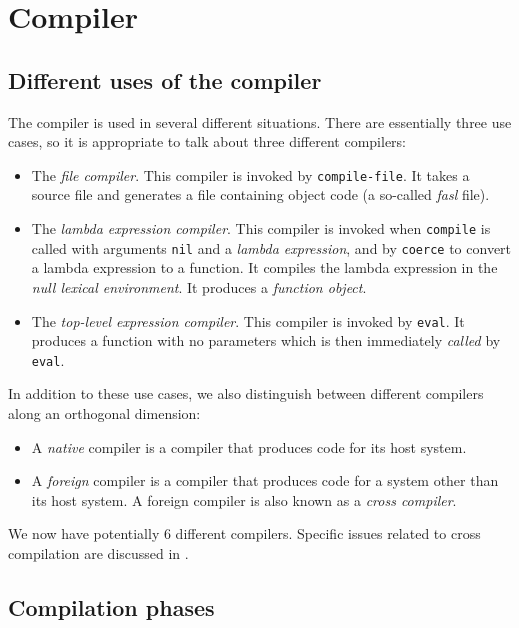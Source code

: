 \chapter{Compiler}
\label{chap-compiler}

\section{Different uses of the compiler}

The compiler is used in several different situations.  There are
essentially three use cases, so it is appropriate to talk about three
different compilers:

\begin{itemize}
\item The \emph{file compiler}.  This compiler is invoked by
  \texttt{compile-file}.  It takes a \cl{} source file and generates a
  file containing object code (a so-called \emph{fasl} file). 
\item The \emph{lambda expression compiler}.  This compiler is invoked
  when \texttt{compile} is called with arguments \texttt{nil} and a
  \emph{lambda expression}, and by \texttt{coerce} to convert a lambda
  expression to a function.  It compiles the lambda expression in the
  \emph{null lexical environment}.  It produces a \emph{function
    object}.
\item The \emph{top-level expression compiler}.  This compiler is
  invoked by \texttt{eval}.  It produces a function with no parameters
  which is then immediately \emph{called} by \texttt{eval}.  
\end{itemize}

In addition to these use cases, we also distinguish between different
compilers along an orthogonal dimension:

\begin{itemize}
\item A \emph{native} compiler is a compiler that produces code for
  its host \cl{} system. 
\item A \emph{foreign} compiler is a compiler that produces code for a
  \cl{} system other than its host system.  A foreign compiler is
  also known as a \emph{cross compiler}.
\end{itemize}

We now have potentially 6 different compilers.  Specific issues
related to cross compilation are discussed in
. 

\section{Compilation phases}

